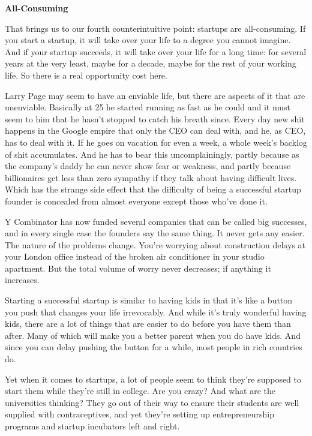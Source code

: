 \textbf{All-Consuming}

That brings us to our fourth counterintuitive point: startups are
all-consuming. If you start a startup, it will take over your life to a
degree you cannot imagine. And if your startup succeeds, it will take
over your life for a long time: for several years at the very least,
maybe for a decade, maybe for the rest of your working life. So there is
a real opportunity cost here.

Larry Page may seem to have an enviable life, but there are aspects of
it that are unenviable. Basically at 25 he started running as fast as he
could and it must seem to him that he hasn't stopped to catch his breath
since. Every day new shit happens in the Google empire that only the CEO
can deal with, and he, as CEO, has to deal with it. If he goes on
vacation for even a week, a whole week's backlog of shit accumulates.
And he has to bear this uncomplainingly, partly because as the company's
daddy he can never show fear or weakness, and partly because
billionaires get less than zero sympathy if they talk about having
difficult lives. Which has the strange side effect that the difficulty
of being a successful startup founder is concealed from almost everyone
except those who've done it.

Y Combinator has now funded several companies that can be called big
successes, and in every single case the founders say the same thing. It
never gets any easier. The nature of the problems change. You're
worrying about construction delays at your London office instead of the
broken air conditioner in your studio apartment. But the total volume of
worry never decreases; if anything it increases.

Starting a successful startup is similar to having kids in that it's
like a button you push that changes your life irrevocably. And while
it's truly wonderful having kids, there are a lot of things that are
easier to do before you have them than after. Many of which will make
you a better parent when you do have kids. And since you can delay
pushing the button for a while, most people in rich countries do.

Yet when it comes to startups, a lot of people seem to think they're
supposed to start them while they're still in college. Are you crazy?
And what are the universities thinking? They go out of their way to
ensure their students are well supplied with contraceptives, and yet
they're setting up entrepreneurship programs and startup incubators left
and right.

